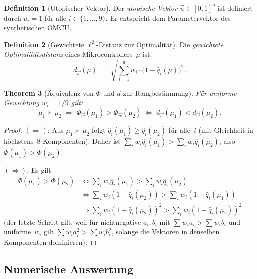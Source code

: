 ﻿\documentclass[12pt, a4paper]{article}
\theoremstyle{plain}
\newtheorem{theorem}{Theorem}[section]
\theoremstyle{definition}
\newtheorem{definition}[theorem]{Definition}
\theoremstyle{remark}
\newcommand{\omcu}{\textsc{OMCU}}
\begin{document}
\begin{definition}[Utopischer Vektor]
\label{def:utopisch}
  Der \emph{utopische Vektor} $\vec{u} \in [0,1]^9$ ist definiert durch
  $u_i = 1$ für alle $i \in \{1,\ldots,9\}$.
  Er entspricht dem Parametervektor des synthetischen \omcu{}.
\end{definition}

\begin{definition}[Gewichtete $\ell^2$-Distanz zur Optimalität]
\label{def:distanz}
  Die \emph{gewichtete Optimalitätsdistanz} eines Mikrocontrollers~$\mu$ ist:
  \[
    d_{\vec{w}}(\mu) \;=\;
    \sqrt{\sum_{i=1}^{9} w_i \cdot \bigl(1 - \hat{q}_i(\mu)\bigr)^2}.
  \]
\end{definition}

\begin{theorem}[Äquivalenz von $\Phi$ und $d$ zur Rangbestimmung]
\label{thm:aquivalenz}
  Für uniforme Gewichtung $w_i = 1/9$ gilt:
  \[
    \mu_1 \succ \mu_2 \;\Longrightarrow\;
    \Phi_{\vec{w}}(\mu_1) > \Phi_{\vec{w}}(\mu_2) \;\Longleftrightarrow\;
    d_{\vec{w}}(\mu_1) < d_{\vec{w}}(\mu_2).
  \]
\end{theorem}

\begin{proof}
  $(\Rightarrow)$: Aus $\mu_1 \succ \mu_2$ folgt $\hat{q}_i(\mu_1) \ge
  \hat{q}_i(\mu_2)$ für alle~$i$ (mit Gleichheit in höchstens~8 Komponenten).
  Daher ist
  $\sum_i w_i \hat{q}_i(\mu_1) > \sum_i w_i \hat{q}_i(\mu_2)$,
  also $\Phi(\mu_1) > \Phi(\mu_2)$.

  $(\Longleftrightarrow)$: Es gilt
  \begin{align*}
    \Phi(\mu_1) > \Phi(\mu_2)
    &\Leftrightarrow \sum_i w_i \hat{q}_i(\mu_1) > \sum_i w_i \hat{q}_i(\mu_2) \\
    &\Leftrightarrow \sum_i w_i (1-\hat{q}_i(\mu_2)) > \sum_i w_i (1-\hat{q}_i(\mu_1)) \\
    &\Rightarrow \sum_i w_i (1-\hat{q}_i(\mu_2))^2 > \sum_i w_i (1-\hat{q}_i(\mu_1))^2
  \end{align*}
  (der letzte Schritt gilt, weil für nichtnegative $a_i, b_i$ mit
  $\sum w_i a_i > \sum w_i b_i$ und uniforme~$w_i$ gilt
  $\sum w_i a_i^2 > \sum w_i b_i^2$, solange die Vektoren in
  denselben Komponenten dominieren).
 
\end{proof}

\subsection{Numerische Auswertung}
\end{document}
